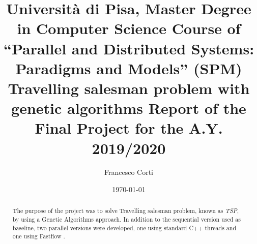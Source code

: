 \documentclass[a4paper, oneside, openany]{article}
\title{{\small Università di Pisa, Master Degree in Computer Science Course of ``Parallel and Distributed Systems: Paradigms and Models'' (SPM)} \vspace{0.7em}
	\huge{\textbf{Travelling salesman problem with genetic algorithms}} \vspace{0.7em}
	\large Report of the Final Project for the A.Y. 2019/2020 \vspace{0.4em}}
\author{Francesco Corti \vspace{0.3em}
	 \vspace{0.4em}}
\date{\today}
\begin{document}
		\maketitle
		\begin{abstract}
			The purpose of the project was to solve Travelling salesman problem, known as \textit{TSP},  by using a Genetic Algorithms approach.
			In addition to the sequential version used as baseline, two parallel versions were developed, one using standard C++ threads and one using Fastflow \cite{fastflow}. 
		\end{abstract}
\vspace{0.3cm}







\end{document}
